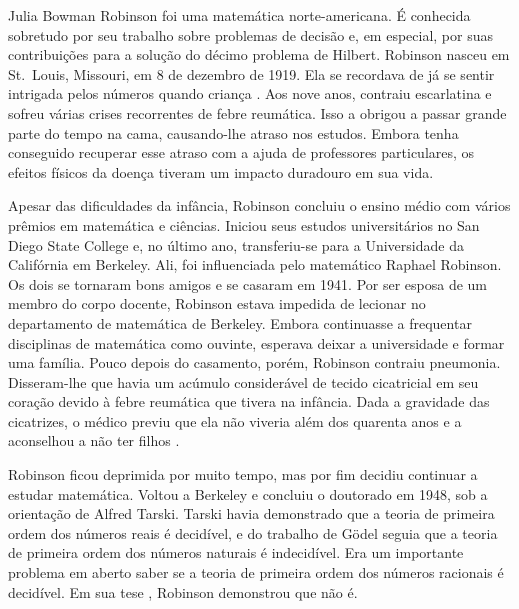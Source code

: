 \documentclass[../../../include/open-logic-section]{subfiles}
\begin{document}



Julia Bowman Robinson foi uma matemática norte-americana. É conhecida
sobretudo por seu trabalho sobre problemas de decisão e, em especial,
por suas contribuições para a solução do décimo problema de Hilbert.
Robinson nasceu em St.~Louis, Missouri, em 8 de dezembro de 1919. Ela
se recordava de já se sentir intrigada pelos números quando criança
\citep[4]{Reid1986}. Aos nove anos, contraiu escarlatina e sofreu
várias crises recorrentes de febre reumática. Isso a obrigou a passar
grande parte do tempo na cama, causando-lhe atraso nos estudos. Embora
tenha conseguido recuperar esse atraso com a ajuda de professores
particulares, os efeitos físicos da doença tiveram um impacto
duradouro em sua vida.

Apesar das dificuldades da infância, Robinson concluiu o ensino médio
com vários prêmios em matemática e ciências. Iniciou seus estudos
universitários no San Diego State College e, no último ano,
transferiu-se para a Universidade da Califórnia em Berkeley. Ali, foi
influenciada pelo matemático Raphael Robinson. Os dois se tornaram
bons amigos e se casaram em 1941. Por ser esposa de um membro do corpo
docente, Robinson estava impedida de lecionar no departamento de
matemática de Berkeley. Embora continuasse a frequentar disciplinas
de matemática como ouvinte, esperava deixar a universidade e formar
uma família. Pouco depois do casamento, porém, Robinson contraiu
pneumonia. Disseram-lhe que havia um acúmulo considerável de tecido
cicatricial em seu coração devido à febre reumática que tivera na
infância. Dada a gravidade das cicatrizes, o médico previu que ela não
viveria além dos quarenta anos e a aconselhou a não ter filhos
\citep[13]{Reid1986}.

Robinson ficou deprimida por muito tempo, mas por fim decidiu
continuar a estudar matemática. Voltou a Berkeley e concluiu o
doutorado em 1948, sob a orientação de Alfred Tarski. Tarski havia
demonstrado que a teoria de primeira ordem dos números reais é
decidível, e do trabalho de G\"odel seguia que a teoria de primeira
ordem dos números naturais é indecidível. Era um importante problema
em aberto saber se a teoria de primeira ordem dos números racionais é
decidível. Em sua tese \citeyearpar{Robinson1949}, Robinson demonstrou
que não é.
\end{document}
